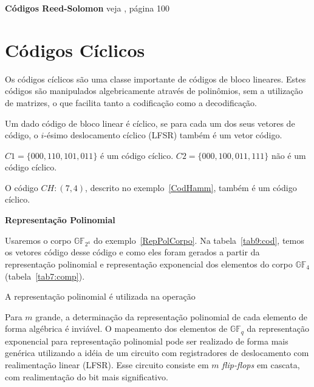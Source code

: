 \begin{example} {\bf Códigos Reed-Solomon} veja \cite{Hefez:2008}, página 100
\end{example}

\section{Códigos Cíclicos}

Os códigos cíclicos são uma classe importante de códigos de bloco lineares. Estes códigos são manipulados algebricamente através de polinômios, sem a utilização de matrizes, o que facilita tanto a codificação como a decodificação.

\begin{definition} Um dado código de bloco linear é cíclico, se para cada um dos seus vetores de código, o $i$-ésimo deslocamento cíclico (LFSR) também é um vetor código.
\end{definition}

\begin{example}
$C1 = \{000, 110, 101, 011\}$ é um código cíclico. $C2 = \{000, 100, 011, 111\}$ não é um código cíclico.

O código $CH:(7,4)$, descrito no exemplo~\ref{CodHamm}, também é um código cíclico.
\end{example}

\begin{definition} {\bf Representação Polinomial} \label{RepPol} 
\end{definition}

\begin{example}
Usaremos o corpo $\mathbb{GF}_{2^4}$ do exemplo~\ref{RepPolCorpo}. Na tabela~\ref{tab9:cod}, temos os vetores código desse código e como eles foram gerados a partir da representação polinomial e representação exponencial dos elementos do corpo $\mathbb{GF}_4$ (tabela~\ref{tab7:comp}).

\end{example}

A representação polinomial é utilizada na operação 

Para $m$ grande, a determinação da representação polinomial de cada elemento de forma algébrica é inviável. O mapeamento dos elementos de $\mathbb{GF}_q$ da representação exponencial para representação polinomial pode ser realizado de forma mais genérica utilizando a idéia de um circuito com registradores de deslocamento com realimentação linear (LFSR). Esse circuito consiste em $m$ \emph{flip-flops} em cascata, com realimentação do bit mais significativo. 

